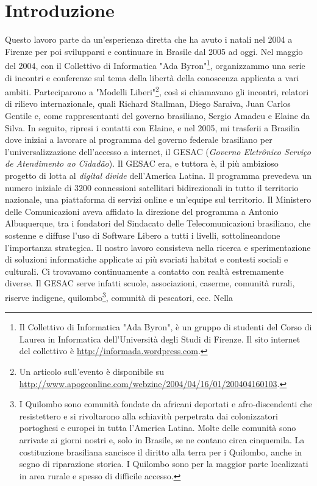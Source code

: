 
\chapter{Introduzione}
\label{Capitolo1}

Questo lavoro parte da un'esperienza diretta che ha avuto i natali nel
2004 a Firenze per poi svilupparsi e continuare in Brasile dal 2005 ad
oggi. Nel maggio del 2004, con il Collettivo di Informatica "Ada
Byron"\footnote{Il Collettivo di Informatica "Ada Byron", è un gruppo
  di studenti del Corso di Laurea in Informatica dell’Università degli
  Studi di Firenze. Il sito internet del collettivo è
  \url{http://informada.wordpress.com}.}, organizzammo una serie di
incontri e conferenze sul tema della libertà della conoscenza
applicata a vari ambiti. Parteciparono a "Modelli Liberi"\footnote{Un
  articolo sull'evento è disponibile su
  \url{http://www.apogeonline.com/webzine/2004/04/16/01/200404160103}.},
così si chiamavano gli incontri, relatori di rilievo internazionale,
quali Richard Stallman, Diego Saraiva, Juan Carlos Gentile e, come
rappresentanti del governo brasiliano, Sergio Amadeu e Elaine da
Silva. In seguito, ripresi i contatti con Elaine, e nel 2005, mi
trasferii a Brasilia dove iniziai a lavorare al programma del governo
federale brasiliano per l'universalizzazione dell'accesso a internet,
il GESAC (\emph{Governo Eletrônico Serviço de Atendimento ao
  Cidadão}). Il GESAC era, e tuttora è, il più ambizioso progetto di
lotta al \emph{digital divide} dell'America Latina. Il programma
prevedeva un numero iniziale di 3200 connessioni satellitari
bidirezionali in tutto il territorio nazionale, una piattaforma di
servizi online e un'equipe sul territorio. Il Ministero delle
Comunicazioni aveva affidato la direzione del programma a Antonio
Albuquerque, tra i fondatori del Sindacato delle Telecomunicazioni
brasiliano, che sostenne e diffuse l'uso di Software Libero a tutti i
livelli, sottolineandone l'importanza strategica. Il nostro lavoro
consisteva nella ricerca e sperimentazione di soluzioni informatiche
applicate ai più svariati habitat e contesti sociali e culturali. Ci
trovavamo continuamente a contatto con realtà estremamente diverse. Il
GESAC serve infatti scuole, associazioni, caserme, comunità rurali,
riserve indigene, quilombo\footnote{I Quilombo sono comunità fondate
  da africani deportati e afro-discendenti che resistettero e si
  rivoltarono alla schiavitù perpetrata dai colonizzatori portoghesi e
  europei in tutta l'America Latina. Molte delle comunità sono
  arrivate ai giorni nostri e, solo in Brasile, se ne contano circa
  cinquemila. La costituzione brasiliana sancisce il diritto alla
  terra per i Quilombo, anche in segno di riparazione storica. I
  Quilombo sono per la maggior parte localizzati in area rurale e
  spesso di difficile accesso.}, comunità di pescatori, ecc. Nella

